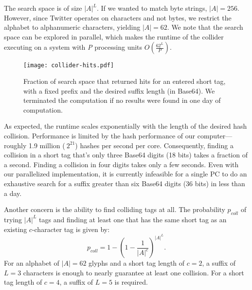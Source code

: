 The search space is of size $|A|^L$. If we wanted to match byte strings,
$|A| = 256$. However, since Twitter operates on characters and not
bytes, we restrict the alphabet to alphanumeric characters, yielding
$|A| = 62$. We note that the search space can be explored in parallel,
which makes the runtime of the collider executing on a system with
\textit{P} processing units $O(\frac{62^L}{P})$.

\begin{figure}
\begin{center}
\texttt{[image: collider-hits.pdf]}
\caption{Fraction of search space that returned hits for an entered short
  tag, with a fixed prefix and the desired suffix length (in
  Base64). We terminated the computation if no results were found in
  one day of computation.\label{fig:collider-hits}}
\end{center}
\end{figure}
\fi


As expected, the runtime
scales exponentially with the length
of the desired hash collision.
Performance is limited by the hash performance of our computer---
roughly 1.9 million ($~2^{21}$) hashes per second per core.
Consequently, finding a collision in a short tag that's only three
Base64 digits (18 bits) takes a fraction of a second. Finding a
collision in four digits takes only a few seconds.
Even with our parallelized implementation, it is currently infeasible for a single PC to
do an exhaustive search for a suffix greater than six Base64
digits (36 bits) in less than a day.


Another concern is the ability to find colliding tags at all. The
probability $p_{coll}$ of trying $|A|^L$ tags and finding at least one
that has the same short tag as an existing $c$-character tag is given
by:
%
\[p_{coll} = 1-\left(1-\frac{1}{|A|^c}\right)^{|A|^L}.\]
%
For an alphabet of $|A|=62$ glyphs and a short tag length of $c=2$, a
suffix of $L=3$ characters is enough to nearly guarantee at least one
collision. For a short tag length of $c=4$, a suffix of $L=5$ is
required. 

